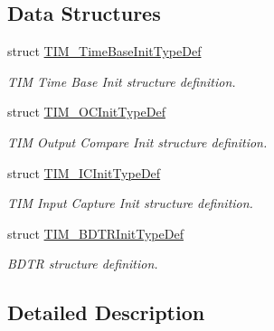 \subsection*{Data Structures}
\begin{DoxyCompactItemize}
\item 
struct \mbox{\hyperlink{struct_t_i_m___time_base_init_type_def}{T\+I\+M\+\_\+\+Time\+Base\+Init\+Type\+Def}}
\begin{DoxyCompactList}\small\item\em T\+IM Time Base Init structure definition. \end{DoxyCompactList}\item 
struct \mbox{\hyperlink{struct_t_i_m___o_c_init_type_def}{T\+I\+M\+\_\+\+O\+C\+Init\+Type\+Def}}
\begin{DoxyCompactList}\small\item\em T\+IM Output Compare Init structure definition. \end{DoxyCompactList}\item 
struct \mbox{\hyperlink{struct_t_i_m___i_c_init_type_def}{T\+I\+M\+\_\+\+I\+C\+Init\+Type\+Def}}
\begin{DoxyCompactList}\small\item\em T\+IM Input Capture Init structure definition. \end{DoxyCompactList}\item 
struct \mbox{\hyperlink{struct_t_i_m___b_d_t_r_init_type_def}{T\+I\+M\+\_\+\+B\+D\+T\+R\+Init\+Type\+Def}}
\begin{DoxyCompactList}\small\item\em B\+D\+TR structure definition. \end{DoxyCompactList}\end{DoxyCompactItemize}


\subsection{Detailed Description}
